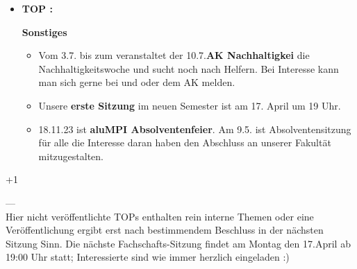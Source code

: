 \documentclass[paper=a4,bibliography=totoc,BCOR=0mm,numbers=noenddot,fontsize=12pt]{scrreprt}
\newcommand{\tops}[2]{\begin{itemize}\item \begin{large}\textbf{TOP \the\numm :~}\end{large}\textbf{#1} \\ #2 \end{itemize} 
\advance\numm +1}
\begin{document}
\tops{Sonstiges}{
\begin{itemize}
    
    \item Vom 3.7. bis zum veranstaltet der 10.7.\textbf{AK Nachhaltigkei} die Nachhaltigkeitswoche und sucht noch nach Helfern. Bei Interesse kann man sich gerne bei und oder dem AK melden.
    \item Unsere \textbf{erste Sitzung} im neuen Semester ist am 17. April um 19 Uhr.
    
    \item 18.11.23 ist \textbf{aluMPI Absolventenfeier}. Am 9.5. ist Absolventensitzung für alle die Interesse daran haben den Abschluss an unserer Fakultät mitzugestalten.

\end{itemize}
}
%
%
\begin{center}
---
\ \\
%
%
%
%
Hier nicht veröffentlichte TOPs enthalten rein interne Themen oder eine Veröffentlichung ergibt erst nach bestimmendem Beschluss in der nächsten Sitzung Sinn. Die nächste Fachschafts-Sitzung findet am Montag den 17.April ab 19:00 Uhr statt; Interessierte sind wie immer herzlich eingeladen :)
\end{center}
\end{document}
